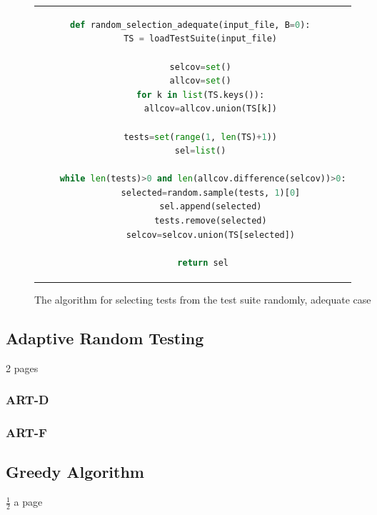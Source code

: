 \begin{figure}[htpb]
\centering
\begin{tabular}{c}
\begin{lstlisting}[language=python]
def random_selection_adequate(input_file, B=0): 
	TS = loadTestSuite(input_file) 

	selcov=set() 
	allcov=set() 
	for k in list(TS.keys()): 
		allcov=allcov.union(TS[k]) 

	tests=set(range(1, len(TS)+1)) 
	sel=list() 

	while len(tests)>0 and len(allcov.difference(selcov))>0:
		selected=random.sample(tests, 1)[0] 
		sel.append(selected) 
		tests.remove(selected) 
		selcov=selcov.union(TS[selected]) 

	return sel
\end{lstlisting}
\end{tabular}
\caption[Random adequate selection]{The algorithm for selecting tests from the test suite randomly, adequate case}\label{fig:random-adequate-listing}
\end{figure}

\subsection{Adaptive Random Testing}

2 pages

\subsubsection{ART-D}

\subsubsection{ART-F}

\subsection{Greedy Algorithm}

$\frac{1}{2}$ a page
